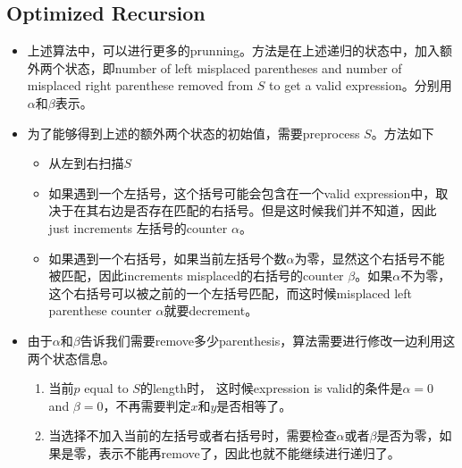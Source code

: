 \subsection{Optimized Recursion}
\begin{itemize}
\item 上述算法中，可以进行更多的prunning。方法是在上述递归的状态中，加入额外两个状态，即number of left misplaced parentheses and number of misplaced right parenthese removed from $S$ to get a valid expression。分别用$\alpha$和$\beta$表示。
\item 为了能够得到上述的额外两个状态的初始值，需要preprocess $S$。方法如下
\begin{itemize}
\item 从左到右扫描$S$
\item 如果遇到一个左括号，这个括号可能会包含在一个valid expression中，取决于在其右边是否存在匹配的右括号。但是这时候我们并不知道，因此just increments 左括号的counter $\alpha$。
\item 如果遇到一个右括号，如果当前左括号个数$\alpha$为零，显然这个右括号不能被匹配，因此increments misplaced的右括号的counter $\beta$。如果$\alpha$不为零，这个右括号可以被之前的一个左括号匹配，而这时候misplaced left parenthese counter $\alpha$就要decrement。
\end{itemize}
\item 由于$\alpha$和$\beta$告诉我们需要remove多少parenthesis，算法需要进行修改一边利用这两个状态信息。
\begin{enumerate}
\item 当前$p$ equal to $S$的length时， 这时候expression is valid的条件是$\alpha=0$ and $\beta=0$，不再需要判定$x$和$y$是否相等了。
\item 当选择不加入当前的左括号或者右括号时，需要检查$\alpha$或者$\beta$是否为零，如果是零，表示不能再remove了，因此也就不能继续进行递归了。
\end{enumerate}
\end{itemize}

